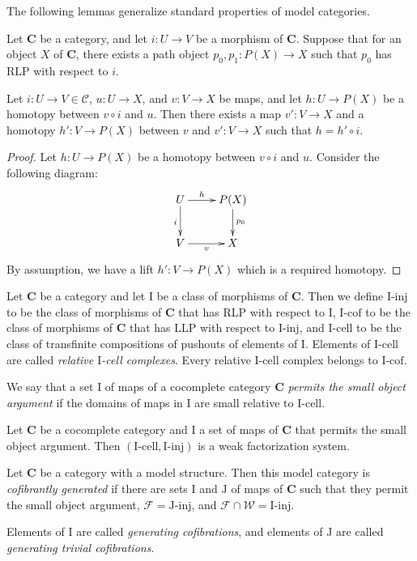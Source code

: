 \documentclass{amsart}
\theoremstyle{definition}
\newcommand{\we}{\mathcal{W}}
\newcommand{\fib}{\mathcal{F}}
\newcommand{\cof}{\mathcal{C}}
\newcommand{\cat}[1]{\mathbf{#1}}
\newcommand{\C}{\cat{C}}
\newcommand{\I}{\mathrm{I}}
\newcommand{\J}{\mathrm{J}}
\newcommand{\class}[2]{#1\text{-}\mathrm{#2}}
\newcommand{\Iinj}[1][\I]{\class{#1}{inj}}
\newcommand{\Icell}[1][\I]{\class{#1}{cell}}
\newcommand{\Icof}[1][\I]{\class{#1}{cof}}
\newcommand{\Jinj}[1][]{\Iinj[\J#1]}
\begin{document}
The following lemmas generalize standard properties of model categories.

\begin{lem}
Let $\C$ be a category, and let $i : U \to V$ be a morphism of $\C$.
Suppose that for an object $X$ of $\C$, there exists a path object $p_0,p_1 : P(X) \to X$ such that $p_0$ has RLP with respect to $i$.

Let $i : U \to V \in \cof$, $u : U \to X$, and $v : V \to X$ be maps, and let $h : U \to P(X)$ be a homotopy between $v \circ i$ and $u$.
Then there exists a map $v' : V \to X$ and a homotopy $h' : V \to P(X)$ between $v$ and $v' : V \to X$ such that $h = h' \circ i$.
\end{lem}
\begin{proof}
Let $h : U \to P(X)$ be a homotopy between $v \circ i$ and $u$.
Consider the following diagram:
\[ \xymatrix{ U \ar[r]^-h \ar[d]_i & P(X) \ar[d]^{p_0} \\
              V \ar[r]_v & X
            } \]
By assumption, we have a lift $h' : V \to P(X)$ which is a required homotopy.
\end{proof}

Let $\C$ be a category and let $\I$ be a class of morphisms of $\C$.
Then we define $\Iinj$ to be the class of morphisms of $\C$ that has RLP with respect to $\I$,
$\Icof$ to be the class of morphisms of $\C$ that has LLP with respect to $\Iinj$, and
$\Icell$ to be the class of transfinite compositions of pushouts of elements of $\I$.
Elements of $\Icell$ are called \emph{relative $\I$-cell complexes}.
Every relative $\I$-cell complex belongs to $\Icof$.

We say that a set $\I$ of maps of a cocomplete category $\C$ \emph{permits the small object argument}
if the domains of maps in $\I$ are small relative to $\Icell$.

\begin{prop}
Let $\C$ be a cocomplete category and $\I$ a set of maps of $\C$ that permits the small object argument.
Then $(\Icell,\Iinj)$ is a weak factorization system.
\end{prop}

\begin{defn}
Let $\C$ be a category with a model structure. Then this model category is
\emph{cofibrantly generated} if there are sets $\I$ and $\J$ of maps of $\C$ such
that they permit the small object argument, $\fib = \Jinj$, and $\fib \cap \we = \Iinj$.

Elements of $\I$ are called \emph{generating cofibrations},
and elements of $\J$ are called \emph{generating trivial cofibrations}.
\end{defn}
\end{document}
